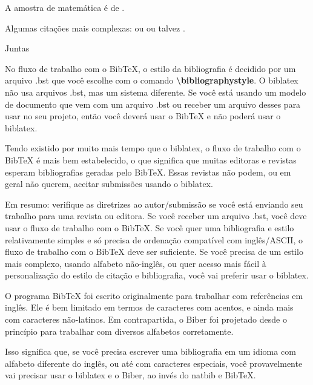 \documentclass[brazilian, 12pt]{article}
\begin{document}
A amostra de matemática é de \autocite{Graham1995}.

Algumas citações mais complexas: \parencite{Graham1995} ou
\textcite{Thomas2008} ou talvez .

\autocite[56]{Thomas2008}

\autocite[See][45-48]{Graham1995}

Juntas \autocite{Thomas2008, Graham1995}

\vspace{2cm}

No fluxo de trabalho com o BibTeX, o estilo da bibliografia é decidido por um arquivo .bst que você escolhe com o comando \textbf{\textbackslash bibliographystyle}. O biblatex não usa arquivos .bst, mas um sistema diferente. Se você está usando um modelo de documento que vem com um arquivo .bst ou receber um arquivo desses para usar no seu projeto, então você deverá usar o BibTeX e não poderá usar o biblatex.

Tendo existido por muito mais tempo que o biblatex, o fluxo de trabalho com o BibTeX é mais bem estabelecido, o que significa que muitas editoras e revistas esperam bibliografias geradas pelo BibTeX. Essas revistas não podem, ou em geral não querem, aceitar submissões usando o biblatex.

Em resumo: verifique as diretrizes ao autor/submissão se você está enviando seu trabalho para uma revista ou editora. Se você receber um arquivo .bst, você deve usar o fluxo de trabalho com o BibTeX. Se você quer uma bibliografia e estilo relativamente simples e só precisa de ordenação compatível com inglês/ASCII, o fluxo de trabalho com o BibTeX deve ser suficiente. Se você precisa de um estilo mais complexo, usando alfabeto não-inglês, ou quer acesso mais fácil à personalização do estilo de citação e bibliografia, você vai preferir usar o biblatex.

O programa BibTeX foi escrito originalmente para trabalhar com referências em inglês. Ele é bem limitado em termos de caracteres com acentos, e ainda mais com caracteres não-latinos. Em contrapartida, o Biber foi projetado desde o princípio para trabalhar com diversos alfabetos corretamente.

Isso significa que, se você precisa escrever uma bibliografia em um idioma com alfabeto diferente do inglês, ou até com caracteres especiais, você provavelmente vai precisar usar o biblatex e o Biber, ao invés do natbib e BibTeX.

\vspace{2cm}

\printbibliography
\end{document}
